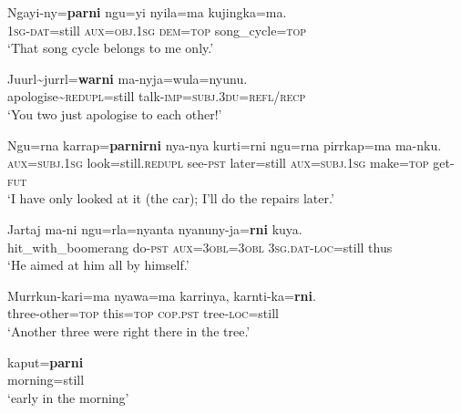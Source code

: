 \begin{exe}
	\ex\label{exAppendixGurindjiRestrictive1}
	\gll Ngayi-ny=\textbf{parni} ngu=yi nyila=ma kujingka=ma.\\
	1\textsc{sg}-\textsc{dat}=still \textsc{aux}=\textsc{obj}.1\textsc{sg} \textsc{dem}=\textsc{top} song\_cycle=\textsc{top}\\
	\glt \lq That song cycle belongs to me only.' \parencite[17]{McConvell1983}
	
	\ex\label{exAppendixGurindjiRestrictive2}
	\gll Juurl\sim jurrl=\textbf{warni} ma-nyja=wula=nyunu.\\
	apologise\sim \textsc{redupl}=still talk-\textsc{imp}=\textsc{subj}.3\textsc{du}=\textsc{refl}/\textsc{recp}\\
	\glt \lq You two just apologise to each other!\rq{ }\parencite[588]{MeakinsMcConvell2021}
	
	\ex\label{exAppendixGurindjiRestrictive3}
	\gll Ngu=rna karrap=\textbf{parnirni} nya-nya kurti=rni ngu=rna pirrkap=ma ma-nku.\\
	\textsc{aux}=\textsc{subj}.1\textsc{sg} look=still.\textsc{redupl} see-\textsc{pst} later=still \textsc{aux}=\textsc{subj}.1\textsc{sg} make=\textsc{top} get-\textsc{fut}\\
	\glt \lq I have only looked at it (the car); I’ll do the repairs later.\rq{ }\parencite[23]{McConvell1983}
	
	\ex\label{exAppendixGurindjiRestrictive4}
	\gll Jartaj ma-ni ngu=rla=nyanta nyanuny-ja=\textbf{rni} kuya.\\
	hit\_with\_boomerang do-\textsc{pst} \textsc{aux}=3\textsc{obl}=3\textsc{obl} 3\textsc{sg}.\textsc{dat}-\textsc{loc}=still thus\\
	\glt \lq He aimed at him all by himself.\rq{ }\parencite[592]{MeakinsMcConvell2021}
	
	\ex\label{exAppendixGurindjiRestrictive5}
	\gll Murrkun-kari=ma nyawa=ma karrinya, karnti-ka=\textbf{rni}.\\
	three-other=\textsc{top} this=\textsc{top} \textsc{cop}.\textsc{pst} tree-\textsc{loc}=still\\
	\glt \lq Another three were right there in the tree.\rq{ }\parencite[593]{MeakinsMcConvell2021} 
	
	\ex\label{exAppendixGurindjiRestrictive6}
	\gll kaput=\textbf{parni}\\
	morning=still\\
	\glt \lq{}early in the morning'  \parencite[20]{McConvell1983} 
\end{exe}


